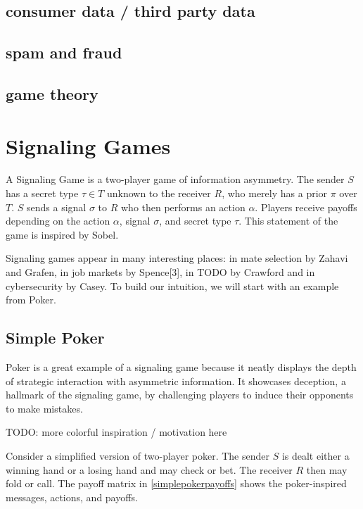 \documentclass{article}
\begin{document}
\subsection{consumer data / third party data}
\subsection{spam and fraud}
\subsection{game theory}

\section{Signaling Games}

A Signaling Game is a two-player game of information asymmetry. The sender $S$ has a secret type $\tau \in T$ unknown to the receiver $R$, who merely has a prior $\pi$ over $T$. $S$ sends a signal $\sigma$ to $R$ who then performs an action $\alpha$. Players receive payoffs depending on the action $\alpha$, signal $\sigma$, and secret type $\tau$. This statement of the game is inspired by Sobel\cite{sobel1}.

Signaling games appear in many interesting places: in mate selection by Zahavi\cite{zahavi1} and Grafen\cite{grafen1}, in job markets by Spence[3], in TODO by Crawford\cite{crawford1} and in cybersecurity by Casey\cite{casey1}\cite{casey2}\cite{casey3}. To build our intuition, we will start with an example from Poker.

\subsection{Simple Poker}

Poker is a great example of a signaling game because it neatly displays the depth of strategic interaction with asymmetric information. It showcases deception, a hallmark of the signaling game, by challenging players to induce their opponents to make mistakes.

TODO: more colorful inspiration / motivation here

Consider a simplified version of two-player poker. The sender $S$ is dealt either a winning hand or a losing hand and may check or bet. The receiver $R$ then may fold or call. The payoff matrix in \ref{simplepokerpayoffs} shows the poker-inspired messages, actions, and payoffs.
\end{document}
